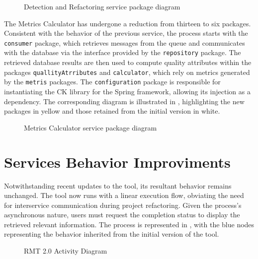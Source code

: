 \begin{figure}[ht!]
\SetCaptionWidth{\textwidth}
\caption{Detection and Refactoring service package diagram}
\label{fig-detection-refactoring-package}

\end{figure}
\FloatBarrier

The Metrics Calculator has undergone a reduction from thirteen to six packages. Consistent with the behavior of the previous service, the process starts with the \texttt{consumer} package, which retrieves messages from the queue and communicates with the database via the interface provided by the \texttt{repository} package. The retrieved database results are then used to compute quality attributes within the packages \texttt{quallityAtrributes} and \texttt{calculator}, which rely on metrics generated by the \texttt{metris} packages. The \texttt{configuration} package is responsible for instantiating the CK library \textcite{ck} for the Spring framework, allowing its injection as a dependency. The corresponding diagram is illustrated in , highlighting the new packages in yellow and those retained from the initial version in white.

\begin{figure}[ht!]
\SetCaptionWidth{\textwidth}
\caption{Metrics Calculator service package diagram}
\label{fig-metrics-calculator-package}

\end{figure}
\FloatBarrier



\section{Services Behavior Improviments}
\label{sec-services-behaivour}

Notwithstanding recent updates to the tool, its resultant behavior remains unchanged. The tool now runs with a linear execution flow, obviating the need for interservice communication during project refactoring. Given the process's asynchronous nature, users must request the completion status to display the retrieved relevant information. The process is represented in , with the blue nodes representing the behavior inherited from the initial version of the tool.

\begin{figure}[ht!]
\SetCaptionWidth{\textwidth}
\caption{RMT 2.0 Activity Diagram}
\label{fig-activity-diagram}
\fontsize{5.8}{8}\selectfont

\end{figure}
\FloatBarrier

